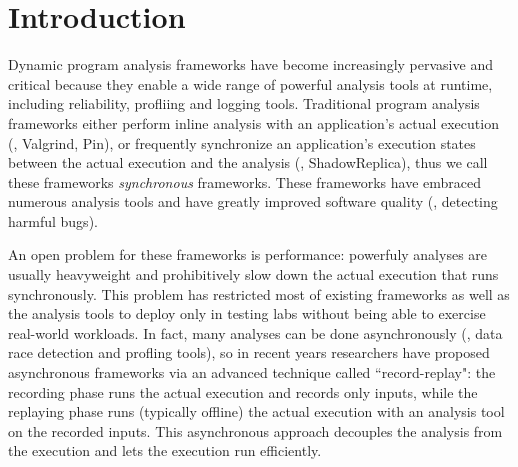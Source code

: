 \section{Introduction} \label{sec:intro}



Dynamic program analysis frameworks have become increasingly pervasive and 
critical because they enable a wide range of powerful analysis tools at 
runtime, including reliability, profliing and logging tools. 
Traditional program analysis frameworks either perform inline analysis with an 
application's actual execution (\eg, Valgrind, Pin), or frequently synchronize 
an application's execution states between the actual execution and the analysis 
(\eg, ShadowReplica), thus we call these frameworks \emph{synchronous} 
frameworks. These frameworks have embraced numerous analysis tools and have 
greatly improved software quality (\eg, detecting harmful bugs).


An open problem for these frameworks is performance: powerfuly analyses are 
usually heavyweight and prohibitively slow down the actual execution that 
runs synchronously. This problem has restricted most of existing frameworks as 
well as the analysis tools to deploy only in testing labs without being able to 
exercise real-world workloads. In fact, many analyses can be done 
asynchronously (\eg, data race detection and profling tools), so in recent 
years researchers have proposed asynchronous frameworks via an advanced 
technique called ``record-replay": the recording phase runs the actual 
execution and records only inputs, while the replaying phase runs (typically 
offline) the actual execution with an analysis tool on the recorded inputs. 
This asynchronous approach decouples the analysis from the execution and lets 
the execution run efficiently. 


